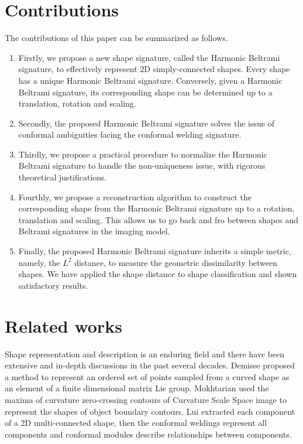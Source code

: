 \documentclass[review,onefignum,onetabnum]{siamonline190516}
\begin{document}
\section{Contributions}
The contributions of this paper can be summarized as follows.
\begin{enumerate}
    \item Firstly, we propose a new shape signature, called the Harmonic Beltrami signature, to effectively represent 2D simply-connected shapes. Every shape has a unique Harmonic Beltrami signature. Conversely, given a Harmonic Beltrami signature, its corresponding shape can be determined up to a translation, rotation and scaling.
    \item Secondly, the proposed Harmonic Beltrami signature solves the issue of conformal ambiguities facing the conformal welding signature.
    \item Thirdly, we propose a practical procedure to normalize the Harmonic Beltrami signature to handle the non-uniqueness issue, with rigorous theoretical justifications.
    \item Fourthly, we propose a reconstruction algorithm to construct the corresponding shape from the Harmonic Beltrami signature up to a rotation, translation and scaling. This allows us to go back and fro between shapes and Beltrami signatures in the imaging model.
    \item Finally, the proposed Harmonic Beltrami signature inherits a simple metric, namely, the $L^2$ distance, to measure the geometric dissimilarity between shapes. We have applied the shape distance to shape classification and shown satisfactory results. 
\end{enumerate}

\section{Related works}\label{related work}
    Shape representation and description is an enduring field and there have been extensive and in-depth discussions in the past several decades. Demisse \etal \cite{demisse2017deformation} proposed a method to represent an ordered set of points sampled from a curved shape as an element of a finite dimensional matrix Lie group. Mokhtarian \etal \cite{mokhtarian1997efficient} used the maxima of curvature zero-crossing contours of Curvature Scale Space image to represent the shapes of object boundary contours. Lui \etal \cite{lui2013shape} extracted each component of a 2D multi-connected shape, then the conformal weldings represent all components and conformal modules describe relationships between components. 
    
\end{document}
